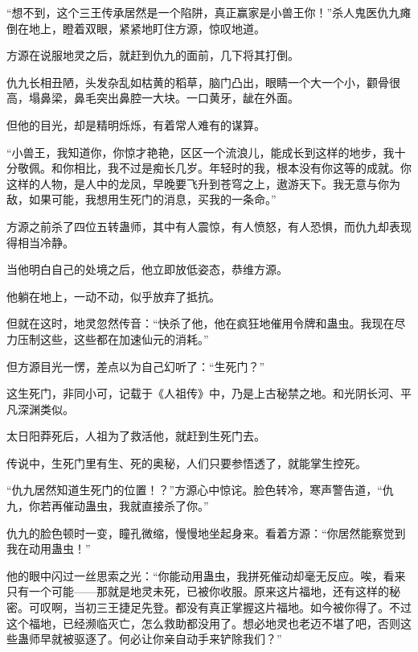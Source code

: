 
\begin{this_body}



“想不到，这个三王传承居然是一个陷阱，真正赢家是小兽王你！”杀人鬼医仇九瘫倒在地上，瞪着双眼，紧紧地盯住方源，惊叹地道。

方源在说服地灵之后，就赶到仇九的面前，几下将其打倒。

仇九长相丑陋，头发杂乱如枯黄的稻草，脑门凸出，眼睛一个大一个小，颧骨很高，塌鼻梁，鼻毛突出鼻腔一大块。一口黄牙，龇在外面。

但他的目光，却是精明烁烁，有着常人难有的谋算。

“小兽王，我知道你，你惊才艳艳，区区一个流浪儿，能成长到这样的地步，我十分敬佩。和你相比，我不过是痴长几岁。年轻时的我，根本没有你这等的成就。你这样的人物，是人中的龙凤，早晚要飞升到苍穹之上，遨游天下。我无意与你为敌，如果可能，我想用生死门的消息，买我的一条命。”

方源之前杀了四位五转蛊师，其中有人震惊，有人愤怒，有人恐惧，而仇九却表现得相当冷静。

当他明白自己的处境之后，他立即放低姿态，恭维方源。

他躺在地上，一动不动，似乎放弃了抵抗。

但就在这时，地灵忽然传音：“快杀了他，他在疯狂地催用令牌和蛊虫。我现在尽力压制这些，这些都在加速仙元的消耗。”

但方源目光一愣，差点以为自己幻听了：“生死门？”

这生死门，非同小可，记载于《人祖传》中，乃是上古秘禁之地。和光阴长河、平凡深渊类似。

太日阳莽死后，人祖为了救活他，就赶到生死门去。

传说中，生死门里有生、死的奥秘，人们只要参悟透了，就能掌生控死。

“仇九居然知道生死门的位置！？”方源心中惊诧。脸色转冷，寒声警告道，“仇九，你若再催动蛊虫，我就直接杀了你。”

仇九的脸色顿时一变，瞳孔微缩，慢慢地坐起身来。看着方源：“你居然能察觉到我在动用蛊虫！”

他的眼中闪过一丝思索之光：“你能动用蛊虫，我拼死催动却毫无反应。唉，看来只有一个可能——那就是地灵未死，已被你收服。原来这片福地，还有这样的秘密。可叹啊，当初三王捷足先登。都没有真正掌握这片福地。如今被你得了。不过这个福地，已经濒临灭亡，怎么救助都没用了。想必地灵也老迈不堪了吧，否则这些蛊师早就被驱逐了。何必让你亲自动手来铲除我们？”


\end{this_body}
